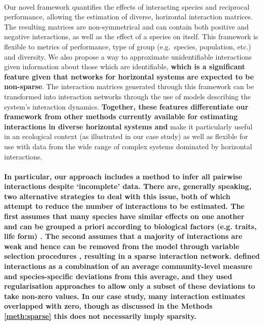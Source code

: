 \documentclass[a4,12pt]{article}
\begin{document}
\begin{refsection}
    \paragraph{} 
    Our novel framework quantifies the effects of interacting species and reciprocal performance, allowing the estimation of diverse, horizontal interaction matrices. The resulting matrices are non-symmetrical and can contain both positive and negative interactions, as well as the effect of a species on itself. This framework is flexible to metrics of performance, type of group (e.g.\ species, population, etc.) and diversity. We also propose a way to approximate unidentifiable interactions given information about those which are identifiable, \textbf{which is a significant feature given that networks for horizontal systems are expected to be non-sparse}. The interaction matrices generated through this framework can be transformed into interaction networks through the use of models describing the system's interaction dynamics. \textbf{Together, these features differentiate our framework from other methods currently available for estimating interactions in diverse horizontal systems and} make it particularly useful in an ecological context (as illustrated in our case study) as well as flexible for use with data from the wide range of complex systems dominated by horizontal interactions.

    \paragraph{}
    \textbf{In particular, our approach includes a method to infer all pairwise interactions despite `incomplete' data. There are, generally speaking, two alternative strategies to deal with this issue, both of which attempt to reduce the number of interactions to be estimated. The first assumes that many species have similar effects on one another and can be grouped a priori according to biological factors (e.g. traits, life form) \parencite{Uriarte2004, Martyn2020}. The second assumes that a majority of interactions are weak and hence can be removed from the model through variable selection procedures \parencite{Mutshinda2009, Weiss-Lehman2022}, resulting in a sparse interaction network. \textcite{Weiss-Lehman2022} defined interactions as a combination of an average community-level measure and species-specific deviations from this average, and they used regularisation approaches to allow only a subset of these deviations to take non-zero values. In our case study, many interaction estimates overlapped with zero, though as discussed in the Methods \ref{meth:sparse} this does not necessarily imply sparsity.}


\end{refsection}
\end{document}
